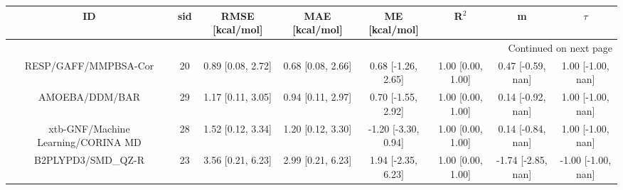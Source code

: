 \documentclass[8pt]{article}
\begin{document}
\begin{center}
\begin{footnotesize}
\begin{longtable}{|cccccccc|}
\toprule
                                 ID & sid &    RMSE [kcal/mol] &     MAE [kcal/mol] &        ME [kcal/mol] &              R$^2$ &                   m &              $\tau$ \\
\midrule
\endhead
\midrule
\multicolumn{8}{r}{{Continued on next page}} \\
\midrule
\endfoot

\bottomrule
\endlastfoot
               RESP/GAFF/MMPBSA-Cor &  20 &  0.89 [0.08, 2.72] &  0.68 [0.08, 2.66] &   0.68 [-1.26, 2.65] &  1.00 [0.00, 1.00] &   0.47 [-0.59, nan] &   1.00 [-1.00, nan] \\
                     AMOEBA/DDM/BAR &  29 &  1.17 [0.11, 3.05] &  0.94 [0.11, 2.97] &   0.70 [-1.55, 2.92] &  1.00 [0.00, 1.00] &   0.14 [-0.92, nan] &   1.00 [-1.00, nan] \\
 xtb-GNF/Machine Learning/CORINA MD &  28 &  1.52 [0.12, 3.34] &  1.20 [0.12, 3.30] &  -1.20 [-3.30, 0.94] &  1.00 [0.00, 1.00] &   0.14 [-0.84, nan] &   1.00 [-1.00, nan] \\
                 B2PLYPD3/SMD\_QZ-R &  23 &  3.56 [0.21, 6.23] &  2.99 [0.21, 6.23] &   1.94 [-2.35, 6.23] &  1.00 [0.00, 1.00] &  -1.74 [-2.85, nan] &  -1.00 [-1.00, nan] \\
\end{longtable}
\end{footnotesize}
\end{center}
\end{document}
